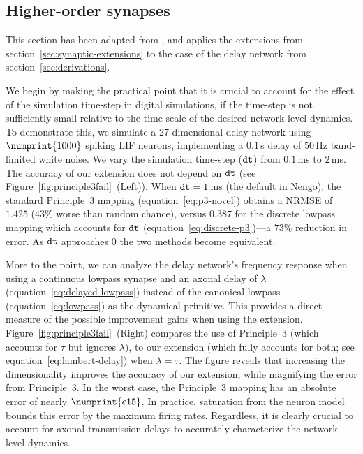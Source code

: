 \subsection{Higher-order synapses}
\label{sec:pure_delay}

This section has been adapted from \citet{voelker2018}, and applies the extensions from section~\ref{sec:synaptic-extensions} to the case of the delay network from section~\ref{sec:derivations}.

We begin by making the practical point that it is crucial to account for the effect of the simulation time-step in digital simulations, if the time-step is not sufficiently small relative to the time scale of the desired network-level dynamics.
To demonstrate this, we simulate a $27$-dimensional delay network using $\numprint{1000}$ spiking LIF neurons, implementing a $0.1$\,s delay of $50$\,Hz band-limited white noise.
We vary the simulation time-step ($\texttt{dt}{}$) from $0.1$\,ms to $2$\,ms.
The accuracy of our extension does not depend on $\texttt{dt}{}$ (see Figure~\ref{fig:principle3fail}~(Left)).
When $\texttt{dt}{}=1$\,ms (the default in Nengo), the standard Principle~3 mapping (equation~\ref{eq:p3-novel}) obtains a NRMSE of $1.425$ ($43\%$ worse than random chance), versus $0.387$ for the discrete lowpass mapping which accounts for $\texttt{dt}{}$ (equation~\ref{eq:discrete-p3})---a $73\%$ reduction in error.
As $\texttt{dt}{}$ approaches $0$ the two methods become equivalent.

More to the point, we can analyze the delay network's frequency response
when using a continuous lowpass synapse and an axonal delay of $\lambda$ (equation~\ref{eq:delayed-lowpass}) instead of the canonical lowpass (equation~\ref{eq:lowpass}) as the dynamical primitive.
This provides a direct measure of the possible improvement gains when using the extension.
Figure~\ref{fig:principle3fail}~(Right) compares the use of Principle~3 (which accounts for $\tau$ but ignores $\lambda)$, to our extension (which fully accounts for both; see equation~\ref{eq:lambert-delay}) when $\lambda = \tau$.
The figure reveals that increasing the dimensionality improves the accuracy of our extension, while magnifying the error from Principle~3.
In the worst case, the Principle~3 mapping has an absolute error of nearly $\numprint{e15}$.
In practice, saturation from the neuron model bounds this error by the maximum firing rates.
Regardless, it is clearly crucial to account for axonal transmission delays to accurately characterize the network-level dynamics.

